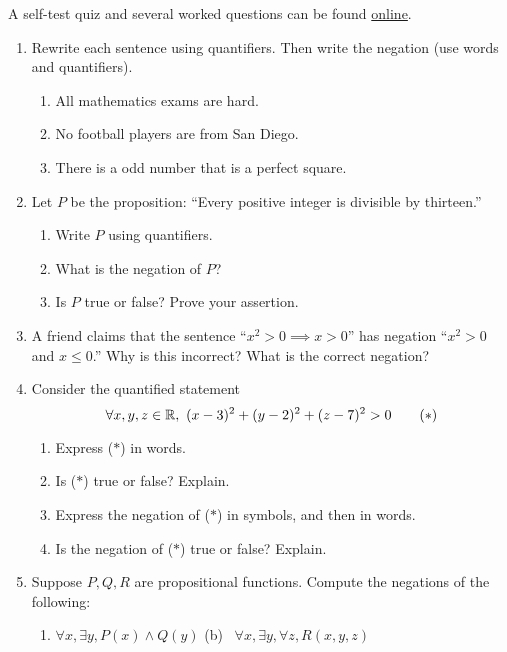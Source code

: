 \begin{exercises}{}{}
	A self-test quiz and several worked questions can be found \href{http://www.math.uci.edu/~ndonalds/math13/selftest/2-2-quants.html}{online}.

	\begin{enumerate}
		\item Rewrite each sentence using quantifiers. Then write the negation (use words and quantifiers).
			\begin{enumerate}
			  \item All mathematics exams are hard.
		  	\item No football players are from San Diego.
		  	\item There is a odd number that is a perfect square.
			\end{enumerate}
			
			
		\item Let $P$ be the proposition: ``Every positive integer is divisible by thirteen.''
	    \begin{enumerate}
	      \item Write $P$ using quantifiers.
	      \item What is the negation of $P$?
	      \item Is $P$ true or false? Prove your assertion.
	    \end{enumerate}
	  
	  
	  \item A friend claims that the sentence ``$x^2>0\implies x>0$'' has negation ``$x^2>0$ and $x\le 0$.'' Why is this incorrect? What is the correct negation?
	  
	
		\item Consider the quantified statement
	    \[
	    	\forall x,y,z\in\mathbb{R},\ (x-3)^2+(y-2)^2+(z-7)^2>0 \tag{$\ast$}
	    \]
			\begin{enumerate}
		    \item Express ($\ast$) in words.
		    \item Is ($\ast$) true or false? Explain.
		    \item Express the negation of ($\ast$) in symbols, and then in words.
		    \item Is the negation of ($\ast$) true or false? Explain.
		  \end{enumerate}
	    
	    
	  \item Suppose $P, Q,R$ are propositional functions. Compute the negations of the following:
	  \begin{enumerate}
	    \item $\forall x,\exists y, P(x)\wedge Q(y)$ \qquad\qquad (b) \ $\forall x,\exists y, \forall z,R(x,y,z)$
	  \end{enumerate}
	  

\end{enumerate}
\end{exercises}
